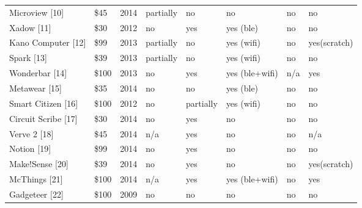 \begin{landscape}
\begin{longtable}{P{2cm}P{1cm}P{1cm}P{1.5cm}P{1.5cm}P{1.5cm}P{.51cm}P{.51cm}}
	    Microview [10]                         & \$45        & 2014         & partially   & no               & no                     & no      & no                       \\
	    Xadow [11]                             & \$30        & 2012         & no          & yes              & yes (ble)              & no      & no                      \\
	    Kano Computer [12]                      & \$99        & 2013         & partially   & no               & yes (wifi)             & no      & yes\newline (scratch)                     \\
	    Spark [13]                             & \$39       & 2013         & partially   & no               & yes (wifi)             & no      & no                 \\
	    Wonderbar [14]                          & \$100 & 2013         & no          & yes              & yes (ble+wifi)         & n/a     & yes              \\
	    Metawear [15]                          & \$35   & 2014         & no          & no               & yes (ble)              & no      & no                         \\
	    Smart Citizen [16]                      & \$100  & 2012         & no          & partially        & yes (wifi)             & no      & no                                \\
	    Circuit Scribe [17]                    & \$30   & 2014         & no          & yes              & no                     & no      & no                                \\
	    Verve 2 [18]                           & \$45   & 2014         & n/a         & yes              & no                     & no      & n/a                               \\
	    Notion	[19]						   & \$99        & 2014         & no          & yes              & no                     & no      & no             \\
	    Make!Sense [20]                        & \$39        & 2014         & no          & yes              & no                     & no      & yes\newline (scratch)                     \\
	    McThings [21]                          & \$100       & 2014         & n/a         & yes              & yes (ble+wifi)         & no      & yes            \\
	    Gadgeteer [22]                         & \$100   & 2009         & no          & no               & no                     & no      & no                                \\

\end{longtable}
\end{landscape}
